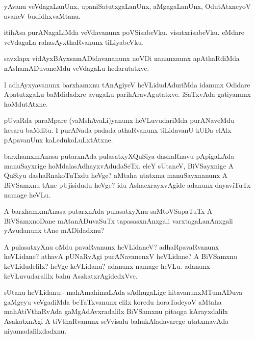 \documentclass{article}
\begin{document}
\begin{mn}
yAvanu veVdagaLanUnx, upaniSatutxgaLanUnx, aMgagaLanUnx, OdutAtxneyoV
avaneV budidhxvaMtanu.
\end{mn}

\begin{mn}
itihAsa purANagaLiMda veVdavanunx
poVSisabeVku. visatxrisabeVku. eMdare veVdagaLa rahasAyxthaRvanunx tiLiyabeVku.
\end{mn}

\begin{mn}
savxlapx vidAyxBAyxsamADidavananunx noVDi nananxnunx apAthaRdiMda
nAshamADuvaneMdu veVdagaLu hedarutatxve.
\end{mn}

\begin{mn}
I adhAyxyavanunx barxhamxnu tAnAgiyeV heVLidudAduriMda idanunx Odidare
ApatutxgaLu baMdidadxre avugaLu parihAravAgutatxve. iSaTxvAda
gatiyanunx hoMdutAtxne.
\end{mn}

\begin{mn}
pUvaRda paraMpare (vaMshAvaLi)yanunx heVLuvudariMda purANaveMdu hesaru
baMditu. I purANada padada athaRvanunx tiLidavanU kUDa elAlx
pApavanUnx kaLedukoLuLxtAtxne.
\end{mn}

\begin{mn}
barxhamxmAnasa putarxnAda pulasatxyXQuSiya dashaRnavu pApigaLAda
manuSayxrige hoMdalasAdhayxvAdudaSeTx. eleY sUtaneV, BiVSayxnige A
QuSiyu dashaRnakoTuTxdu heVge? aMtaha utatxma manuSayxnanunx A
BiVSamxnu tAne pUjisidudu heVge? idu AshacxrayxvAgide adanunx
dayaviTuTx namage heVLu.
\end{mn}

\begin{mn}%
 A barxhamxmAnasa putarxnAda pulasatxyXnu saMtoVSapaTuTx A
 BiVSamxnoDane mAtanADuvaSuTx tapasasxnAnxgali varxtagaLanAnxgali
 yAvudanunx tAne mADidadxnu?
\end{mn}

\begin{mn}
A pulasatxyXnu oMdu pavaRvanunx heVLidaneV? adhaRpavaRvanunx
heVLidane? athavA pUNaRvAgi purANavanenxV heVLidane? A BiVSamxnu
keVLidudelilx? heVge keVLidanu? adanunx namage heVLu. adanunx
keVLuvudaralilx bahu AsakatxrAgidedxVve.
\end{mn}

\begin{mn}
sUtanu heVLidanu:- mahAmahimaLAda sAdhugaLige hitavanunxMTumADuva
gaMgeyu veVgadiMda beTaTxvanunx elilx koredu horaTadeyoV aMtaha
mahAtiVthaRvAda gaMgAdAvxradalilx BiVSamxnu pitaqga kArayxdalilx
AsakatxnAgi A tiVthaRvanunx seVvisalu bahukAladavarege utatxmavAda niyamadalilxdadxnu.
\end{mn}
\end{document}
